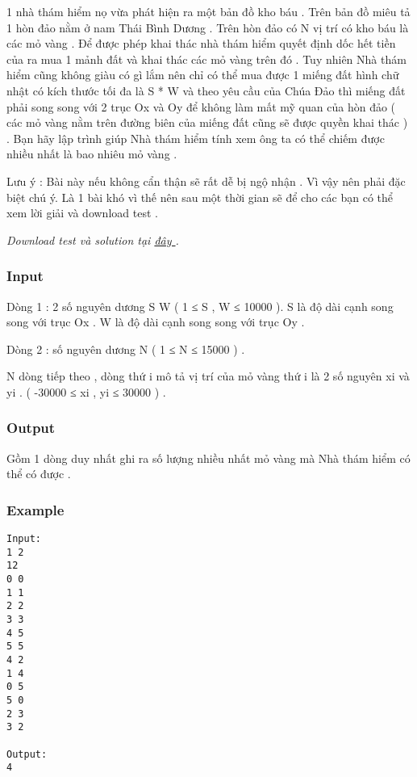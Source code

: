 



   1 nhà thám hiểm nọ vừa phát hiện ra một bản đồ kho báu . Trên bản đồ miêu tả 1 hòn đảo  nằm ở nam Thái Bình Dương . Trên hòn đảo có N vị trí có kho báu là các mỏ vàng . Để được phép khai thác nhà thám hiểm quyết định dốc hết tiền của ra mua 1 mảnh đất và khai thác các mỏ vàng trên đó . Tuy nhiên Nhà thám hiểm cũng không giàu có gì lắm nên chỉ có thể mua được 1 miếng đất hình chữ nhật có kích thước tối đa là S * W và theo yêu cầu của Chúa Đảo thì miếng đất phải song song với 2 trục Ox và Oy để không làm mất mỹ quan của hòn đảo ( các mỏ vàng nằm trên đường biên của miếng đất cũng sẽ được quyền khai thác ) . Bạn hãy lập trình giúp Nhà thám hiểm tính xem ông ta có thể chiếm được nhiều nhất là bao nhiêu mỏ vàng .   


       Lưu ý : Bài này nếu không cẩn thận sẽ rất dễ bị ngộ nhận . Vì vậy nên phải đặc biệt chú ý. Là 1 bài khó vì thế nên sau một thời gian sẽ để cho các bạn có thể xem lời giải và download test .      





\textit{    Download test và solution tại    \href{http://vn.spoj.pl/content/GOLD.rar}{     đây    }    .   }

\subsubsection{   Input  }

   Dòng 1 : 2 số nguyên dương S W ( 1 ≤ S , W ≤ 10000 ). S là độ dài cạnh song song với trục Ox . W là độ dài cạnh song song với trục Oy .   


   Dòng 2 : số nguyên dương N ( 1 ≤ N ≤ 15000 ) .   


   N dòng tiếp theo , dòng thứ i mô tả vị trí của mỏ vàng thứ i là 2 số nguyên xi và yi . ( -30000 ≤ xi , yi ≤ 30000 ) .  

\subsubsection{   Output  }

   Gồm 1 dòng duy nhất ghi ra số lượng nhiều nhất mỏ vàng mà Nhà thám hiểm có thể có được .  

\subsubsection{   Example  }
\begin{verbatim}
Input:
1 2
12
0 0
1 1
2 2
3 3
4 5
5 5
4 2
1 4
0 5
5 0
2 3
3 2

Output:
4
\end{verbatim}
